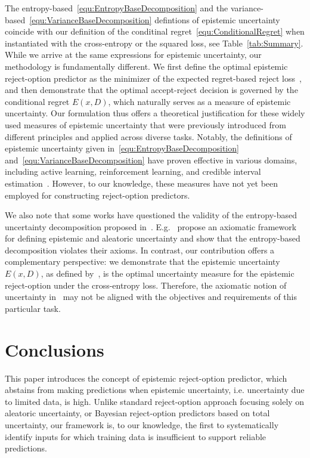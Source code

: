 The entropy-based~\eqref{equ:EntropyBaseDecomposition} and the variance-based~\eqref{equ:VarianceBaseDecomposition} defintions of epistemic uncertainty coincide with our definition of the conditinal regret~\eqref{equ:ConditionalRegret} when instantiated with the cross-entropy or the squared loss, see Table~\ref{tab:Summary}. While we arrive at the same expressions for epistemic uncertainty, our methodology is fundamentally different. We first define the optimal epistemic reject-option predictor as the minimizer of the expected regret-based reject loss~, and then demonstrate that the optimal accept-reject decision is governed by the conditional regret $E(x,D)$, which naturally serves as a measure of epistemic uncertainty.
%
Our formulation thus offers a theoretical justification for these widely used measures of epistemic uncertainty that were previously introduced from different principles and applied across diverse tasks. Notably, the definitions of epistemic uncertainty given in~\eqref{equ:EntropyBaseDecomposition} and~\eqref{equ:VarianceBaseDecomposition} have proven effective in various domains, including active learning, reinforcement learning, and credible interval estimation~\cite{Depeweg-Decompos-ICML2018,Wang-EpistQuant-CVPR2024}. However, to our knowledge, these measures have not yet been employed for constructing reject-option predictors.

We also note that some works have questioned the validity of the entropy-based uncertainty decomposition proposed in~\cite{Depeweg-Decompos-ICML2018}. E.g.~\cite{Wimmer-Proper-CUAI2023} propose an axiomatic framework for defining epistemic and aleatoric uncertainty and show that the entropy-based decomposition violates their axioms. In contrast, our contribution offers a complementary perspective: we demonstrate that the epistemic uncertainty $E(x, D)$, as defined by~, is the optimal uncertainty measure for the epistemic reject-option under the cross-entropy loss. Therefore, the axiomatic notion of uncertainty in~\cite{Wimmer-Proper-CUAI2023} may not be aligned with the objectives and requirements of this particular task.


\section{Conclusions}
This paper introduces the concept of epistemic reject-option predictor, which abstains from making predictions when epistemic uncertainty, i.e. uncertainty due to limited data, is high. Unlike standard reject-option approach focusing solely on aleatoric uncertainty, or Bayesian reject-option predictors based on total uncertainty, our framework is, to our knowledge, the first to systematically identify inputs for which training data is insufficient to support reliable predictions. 


